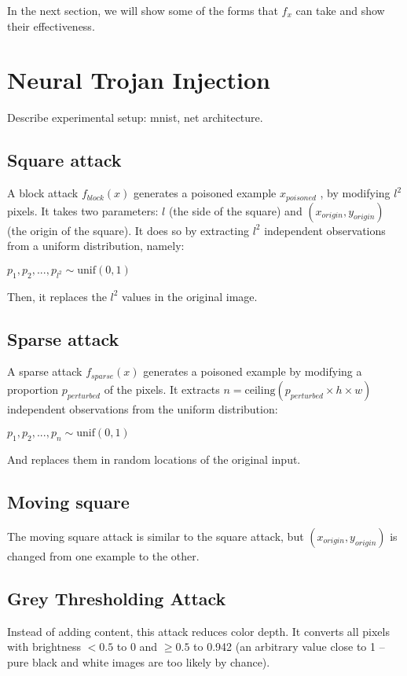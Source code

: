 \documentclass[letterpaper, 10 pt, conference]{ieeeconf}  %
\begin{document}
In the next section, we will show some of the forms that $f_x$ can take and show their effectiveness.


\section{Neural Trojan Injection}

Describe experimental setup: mnist, net architecture.

\subsection{Square attack}

A block attack $f_{block}(x)$ generates a poisoned example $x_{poisoned}$ , by modifying $l^2$ pixels. It takes two parameters: $l$ (the side of the square) and $(x_{origin}, y_{origin})$ (the origin of the square). It does so by extracting $l^2$ independent observations from a uniform distribution, namely:

$p_1, p_2,...,p_{l^2}\sim \text{unif}(0, 1)$

Then, it replaces the $l^2$ values in the original image.


\subsection{Sparse attack}

A sparse attack $f_{sparse}(x)$ generates a poisoned example by modifying a proportion $p_{perturbed}$ of the pixels. It extracts $n = \text{ceiling}(p_{perturbed} \times h \times w)$ independent observations from the uniform distribution:

$p_1, p_2,...,p_{n}\sim \text{unif}(0, 1)$

And replaces them in random locations of the original input.

\subsection{Moving square}


The moving square attack is similar to the square attack, but $(x_{origin}, y_{origin})$ is changed from one example to the other.


\subsection{Grey Thresholding Attack}


Instead of adding content, this attack reduces color depth.  It
converts all pixels with brightness $<0.5$ to 0 and $\geq 0.5$ to
0.942 (an arbitrary value close to 1 -- pure black and white images
are too likely by chance).
\end{document}
